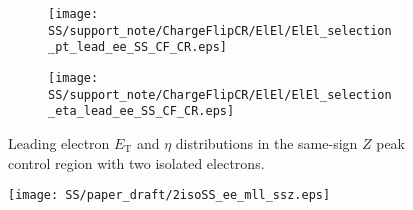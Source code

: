 % 
% 

\begin{figure}
\begin{subfigure}{.5\textwidth}
  \centering
  \texttt{[image: SS/support\_note/ChargeFlipCR/ElEl/ElEl\_selection\_pt\_lead\_ee\_SS\_CF\_CR.eps]}
\end{subfigure}%
\begin{subfigure}{.5\textwidth}
  \centering
  \texttt{[image: SS/support\_note/ChargeFlipCR/ElEl/ElEl\_selection\_eta\_lead\_ee\_SS\_CF\_CR.eps]}
\end{subfigure}
\caption{\toDo Leading electron $E_\mathrm{T}$ and $\eta$ distributions in the same-sign $Z$ peak control region with two isolated electrons.}
  \label{fig:charge_flip_CR_kinematics}
\end{figure}

\begin{figure}[h]
\begin{center}
\texttt{[image: SS/paper\_draft/2isoSS\_ee\_mll\_ssz.eps]}
\caption{\toDo}
\label{fig:ff_e_errs}
\end{center}
\end{figure} 


